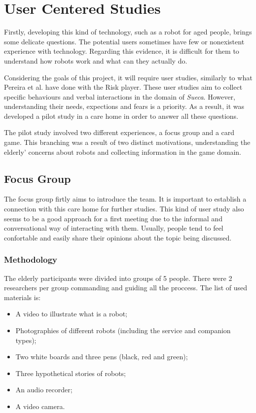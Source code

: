 \section{User Centered Studies} \label{sec:userstudies}

Firstly, developing this kind of technology, such as a robot for aged people, brings some delicate questions.
The potential users sometimes have few or nonexistent experience with technology.
Regarding this evidence, it is difficult for them to understand how robots work and what can they actually do.

Considering the goals of this project, it will require user studies, similarly to what Pereira et al. have done with the Risk player.
These user studies aim to collect specific behaviours and verbal interactions in the domain of \emph{Sueca}.
However, understanding their needs, expections and fears is a
priority. 
As a result, it was developed a pilot study in a care home in order to answer all these questions.

The pilot study involved two different
experiences,
 a focus group and a card game.
This branching was a result of two distinct motivations, understanding the elderly' concerns about robots and collecting information in the game domain.





\subsection{Focus Group}
The focus group firtly aims to introduce the team.
It is important to establish a connection with this care home for further studies.
This kind of user study also seems to be a good approach for a first meeting due to the informal and conversational way of interacting with them.
Usually, people tend to feel confortable and easily share their opinions about the topic being discussed.

\subsubsection{Methodology}
The elderly participants were divided into groups of 5 people.
There were 2 researchers per group commanding and guiding all the proccess.
The list of used materials is:

\begin{itemize}
\item A video to illustrate what is a robot;
\item Photographies of different robots (including the service and companion types);
\item Two white boards and three pens (black, red and green);
\item Three hypothetical stories of robots;
\item An audio recorder;
\item A video camera.
\end{itemize}

